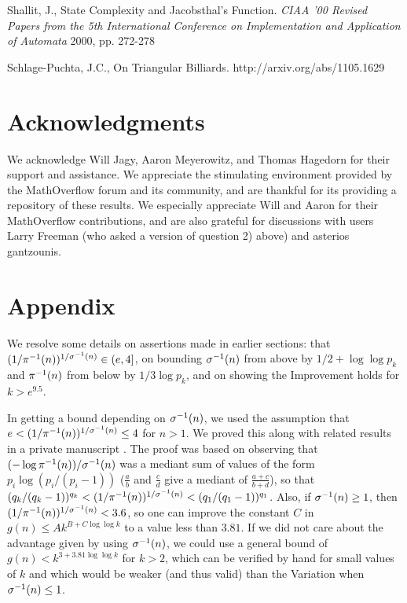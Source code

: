\documentclass[12pt,leqno]{article}
\begin{document}
Shallit, J., State Complexity and Jacobsthal's Function.
\textit{CIAA '00 Revised Papers from the 5th International Conference on 
Implementation and Application of Automata} 2000, pp. 272-278

Schlage-Puchta, J.C., On Triangular Billiards. \newline
http://arxiv.org/abs/1105.1629 

\section{Acknowledgments}

We acknowledge Will Jagy, Aaron Meyerowitz, and Thomas Hagedorn for their support and 
assistance.  We appreciate the stimulating environment provided by the MathOverflow forum
and its community, and are thankful for its providing a repository of these results.
We especially appreciate Will and Aaron for their MathOverflow contributions, and are 
also grateful for discussions with 
users Larry Freeman (who asked a version of question 2) above) and asterios gantzounis.

\section{Appendix}

We resolve some details on assertions made in earlier sections: that
$(1/{\pi}^{-1}(n))^{1/{\sigma}^{-1}(n)} \in (e,4]$, on bounding 
${\sigma}^{-1}(n)$ from above by $1/2 + \log\log p_k$ and ${\pi}^{-1}(n)$ from below by
$1/3\log p_k$, and on showing the Improvement holds for $k \gt e^{9.5}$.

In getting a bound depending on ${\sigma}^{-1}(n)$, we used the assumption that
$e < (1/{\pi}^{-1}(n))^{1/{\sigma}^{-1}(n)} \leq 4$ for $n \gt 1$.  We proved this
along with related results in a private manuscript \cite{P}. The 
proof was based on observing that
$(-\log {\pi}^{-1}(n))/{\sigma}^{-1}(n)$ was a mediant sum of values of the form $p_i\log(p_i/(p_i-1))$
 ($\frac{a}{b}$ and
$\frac{c}{d}$ give a mediant of $\frac{a+c}{b+d}$), so that
$(q_k/(q_k-1))^{q_k} < (1/{\pi}^{-1}(n))^{1/{\sigma}^{-1}(n)} < (q_1/(q_1-1))^{q_1}$.
Also, if ${\sigma}^{-1}(n) \geq 1$, then
$(1/{\pi}^{-1}(n))^{1/{\sigma}^{-1}(n)}< 3.6$, so one can improve the constant $C$ in
$g(n) \leq Ak^{B + C\log\log k}$ to a value less than $3.81$.  If we did not care
about the advantage given by using ${\sigma}^{-1}(n)$, we could use a general bound of
$g(n) \lt k^{3 + 3.81\log\log k}$ for $k>2$, which can be verified by hand for small
values of $k$ and which would be weaker (and thus valid) than the Variation when ${\sigma}^{-1}(n) \leq 1$.
\end{document}
